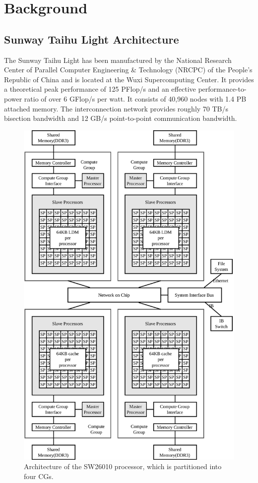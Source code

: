 \documentclass[conference]{IEEEtran}
\begin{document}
\section{Background}
\label{Related Work}

\subsection{Sunway Taihu Light Architecture}
\label{Sunway Taihu Light}

The Sunway Taihu Light has been manufactured by the National Research Center of Parallel Computer Engineering \& Technology (NRCPC) of the People's Republic of China and is located at the Wuxi Supercomputing Center. It provides a theoretical peak performance of 125 PFlop/s and an effective performance-to-power ratio of over 6 GFlop/s per watt. It consists of 40,960 nodes with 1.4 PB attached memory. The interconnection network provides roughly 70 TB/s bisection bandwidth and 12 GB/s point-to-point communication bandwidth.

\begin{figure}[!htb]
	\begin{center}
		\includegraphics[width=\linewidth]{SW26010}
		\caption{Architecture of the SW26010 processor, which is partitioned into four CGs.}
		\label{fig:SW26010}
	\end{center}
\end{figure}
\end{document}
